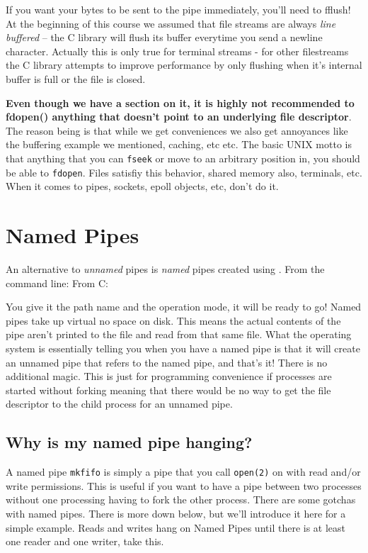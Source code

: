 If you want your bytes to be sent to the pipe immediately, you'll need to fflush!
At the beginning of this course we assumed that file streams are always \emph{line buffered} -- the C library will flush its buffer everytime you send a newline character.
Actually this is only true for terminal streams - for other filestreams the C library attempts to improve performance by only flushing when it's internal buffer is full or the file is closed.

\textbf{Even though we have a section on it, it is highly not recommended to fdopen() anything that doesn't point to an underlying file descriptor}. The reason being is that while we get conveniences we also get annoyances like the buffering example we mentioned, caching, etc etc.
The basic UNIX motto is that anything that you can \texttt{fseek} or move to an arbitrary position in, you should be able to \texttt{fdopen}. Files satisfiy this behavior, shared memory also, terminals, etc.
When it comes to pipes, sockets, epoll objects, etc, don't do it.

\section{Named Pipes}

An alternative to \emph{unnamed} pipes is \emph{named} pipes created using .
From the command line:  From C: 

You give it the path name and the operation mode, it will be ready to go!
Named pipes take up virtual no space on disk.
This means the actual contents of the pipe aren't printed to the file and read from that same file.
What the operating system is essentially telling you when you have a named pipe is that it will create an unnamed pipe that refers to the named pipe, and that's it!
There is no additional magic.
This is just for programming convenience if processes are started without forking meaning that there would be no way to get the file descriptor to the child process for an unnamed pipe.

\subsection{Why is my named pipe hanging?}

A named pipe \texttt{mkfifo} is simply a pipe that you call \texttt{open(2)} on with read and/or write permissions.
This is useful if you want to have a pipe between two processes without one processing having to fork the other process.
There are some gotchas with named pipes.
There is more down below, but we'll introduce it here for a simple example.
Reads and writes hang on Named Pipes until there is at least one reader and one writer, take this.


